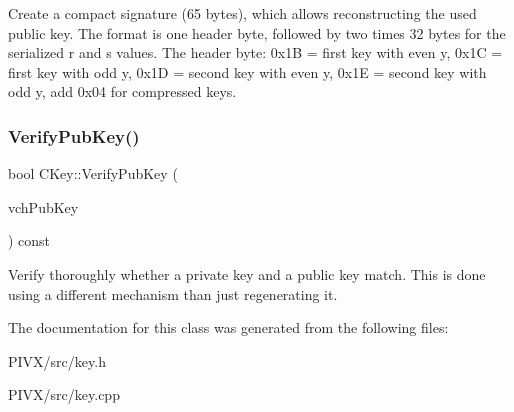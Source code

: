 Create a compact signature (65 bytes), which allows reconstructing the used public key. The format is one header byte, followed by two times 32 bytes for the serialized r and s values. The header byte\+: 0x1B = first key with even y, 0x1C = first key with odd y, 0x1D = second key with even y, 0x1E = second key with odd y, add 0x04 for compressed keys. \mbox{\label{class_c_key_ac53425b8d0f89067bce781c485101b20}} 
\subsubsection{\texorpdfstring{Verify\+Pub\+Key()}{VerifyPubKey()}}
{\footnotesize\ttfamily bool C\+Key\+::\+Verify\+Pub\+Key (\begin{DoxyParamCaption}\item[{const \mbox{\hyperlink{class_c_pub_key}{C\+Pub\+Key}} \&}]{vch\+Pub\+Key }\end{DoxyParamCaption}) const}

Verify thoroughly whether a private key and a public key match. This is done using a different mechanism than just regenerating it. 

The documentation for this class was generated from the following files\+:\begin{DoxyCompactItemize}
\item 
P\+I\+V\+X/src/key.\+h\item 
P\+I\+V\+X/src/key.\+cpp\end{DoxyCompactItemize}
